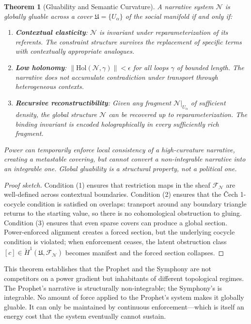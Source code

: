 \documentclass[12pt, oneside]{article}
\theoremstyle{plain}
\newtheorem{theorem}{Theorem}[section]
\theoremstyle{definition}
\theoremstyle{remark}
\newcommand{\Sheaf}{\mathcal{F}}
\newcommand{\covers}{\mathfrak{U}}
\begin{document}
\begin{theorem}[Gluability and Semantic Curvature]
\label{thm:gluability}
A narrative system $\mathcal{N}$ is \emph{globally gluable} across
a cover $\covers = \{U_\alpha\}$ of the social manifold if and only
if:
\begin{enumerate}
  \item \textbf{Contextual elasticity}: $\mathcal{N}$ is invariant
  under reparameterization of its referents. The constraint structure
  survives the replacement of specific terms with contextually
  appropriate analogues.
  \item \textbf{Low holonomy}: $\|\mathrm{Hol}(\mathcal{N}, \gamma)\|
  < \epsilon$ for all loops $\gamma$ of bounded length. The narrative
  does not accumulate contradiction under transport through
  heterogeneous contexts.
  \item \textbf{Recursive reconstructibility}: Given any fragment
  $\mathcal{N}|_{U_\alpha}$ of sufficient density, the global
  structure $\mathcal{N}$ can be recovered up to reparameterization.
  The binding invariant is encoded holographically in every
  sufficiently rich fragment.
\end{enumerate}
Power can temporarily enforce local consistency of a high-curvature
narrative, creating a metastable covering, but cannot convert a
non-integrable narrative into an integrable one. Global gluability
is a structural property, not a political one.
\end{theorem}

\begin{proof}[Proof sketch]
Condition (1) ensures that restriction maps in the sheaf
$\Sheaf_{\mathcal{N}}$ are well-defined across contextual boundaries.
Condition (2) ensures that the \v{C}ech 1-cocycle condition is
satisfied on overlaps: transport around any boundary triangle
returns to the starting value, so there is no cohomological
obstruction to gluing. Condition (3) ensures that even sparse covers
can produce a global section. Power-enforced alignment creates a
forced section, but the underlying cocycle condition is violated;
when enforcement ceases, the latent obstruction class
$[c] \in \check{H}^1(\covers, \Sheaf_{\mathcal{N}})$ becomes
manifest and the forced section collapses.
\end{proof}

This theorem establishes that the Prophet and the Symphony are not
competitors on a power gradient but inhabitants of different
topological regimes. The Prophet's narrative is structurally
non-integrable; the Symphony's is integrable. No amount of force
applied to the Prophet's system makes it globally gluable. It can
only be maintained by continuous enforcement---which is itself an
energy cost that the system eventually cannot sustain.
\end{document}
